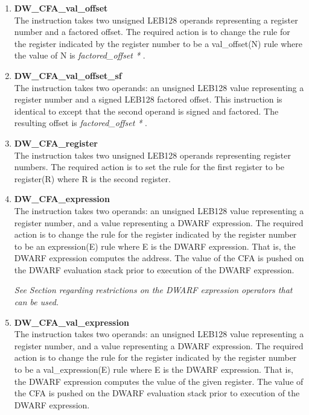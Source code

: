 \begin{enumerate}[1. ]
\item \textbf{DW\_CFA\_val\_offset} \\
The  
instruction takes two unsigned
LEB128 operands representing a register number and a
factored offset. The required action is to change the rule
for the register indicated by the register number to be a
val\_offset(N) rule where the value of N is 
\textit{factored\_offset * }.

\item \textbf{DW\_CFA\_val\_offset\_sf} \\
The  instruction takes two operands: an
unsigned LEB128 value representing a register number and a
signed LEB128 factored offset. This instruction is identical
to  except that the second operand is signed
and factored. The resulting offset is 
\textit{factored\_offset * }.

\item \textbf{DW\_CFA\_register} \\
The  
instruction takes two unsigned LEB128
operands representing register numbers. The required action
is to set the rule for the first register to be register(R)
where R is the second register.

\item \textbf{DW\_CFA\_expression} \\
The  
instruction takes two operands: an
unsigned LEB128 
value representing a register number, and
a  
value representing a DWARF expression. 
The
required action is to change the rule for the register
indicated by the register number to be an expression(E)
rule where E is the DWARF expression. That is, the DWARF
expression computes the address. The value of the CFA is
pushed on the DWARF evaluation stack prior to execution of
the DWARF expression.

\textit{See Section  
regarding restrictions on the DWARF
expression operators that can be used.}

\item \textbf{DW\_CFA\_val\_expression} \\
The  instruction takes two operands:
an unsigned LEB128 
value representing a register number, and
a  
value representing a DWARF expression. The
required action is to change the rule for the register
indicated by the register number to be a val\_expression(E)
rule where E is the DWARF expression. That is, the DWARF
expression computes the value of the given register. The value
of the CFA is pushed on the DWARF evaluation stack prior to
execution of the DWARF expression.


\end{enumerate}

